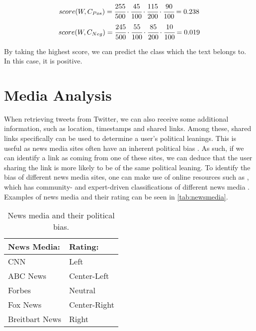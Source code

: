 \begin{equation}\label{e:Pos}
score(W, C_{Pos}) = \cfrac{255}{500} \cdot \cfrac{45}{100} \cdot
\cfrac{115}{200} \cdot \cfrac{90}{100} = 0.238
\end{equation}
\begin{equation}\label{e:Neg}
score(W, C_{Neg}) = \cfrac{245}{500} \cdot \cfrac{55}{100} \cdot \cfrac{85}{200}
\cdot \cfrac{10}{100} = 0.019
\end{equation}

By taking the highest score, we can predict the class which the text
belongs to. In this case, it is positive.

\section{Media Analysis}\label{sec:mediaAnalysis}
When retrieving tweets from Twitter, we can also receive some additional
information, such as location, timestamps and shared links. Among these, shared
links specifically can be used to determine a user's political leanings. This is
useful as news media sites often have an inherent political bias
\citep{allSidesBias}. As such, if we can identify a link as coming from one of these
sites, we can deduce that the user sharing the link is more likely to be of
the same political leaning. To identify the bias of different news
media sites, one can make use of online resources such as ,
which has community- and expert-driven classifications of different news media
\citep{allSidesBias}. Examples of news media and their rating can be seen in
\autoref{tab:newsmedia}.

\begin{table}[H]\centering
\begin{tabular}{|l|l|}\hline
\textbf{News Media:} & \textbf{Rating:}	\\\hline
CNN				&	Left		\\\hline
ABC News		&	Center-Left	\\\hline
Forbes			&	Neutral		\\\hline
Fox News		&	Center-Right\\\hline
Breitbart News	&	Right		\\\hline
\end{tabular}
\caption{News media and their political bias.}
\label{tab:newsmedia}
\end{table}

